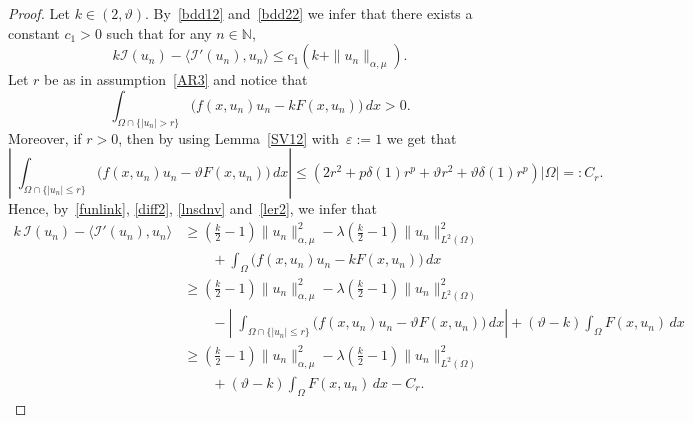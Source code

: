 \documentclass[10pt,a4paper]{amsart}
\def \N {\mathbb{N}}
\renewcommand{\ge}{\geqslant}
\renewcommand{\le}{\leqslant}
\begin{document}
\begin{proof}
Let $k\in (2, \vartheta)$. By~\eqref{bdd12} and~\eqref{bdd22} we infer that there exists a constant $c_1>0$ such that for any $n\in\N$,
\begin{equation}\label{ndkjsc}
k \mathcal I(u_n) -\langle \mathcal I'(u_n), u_n\rangle \le c_1 (k +\|u_n\|_{\alpha, \mu}).
\end{equation}
Let $r$ be as in assumption~\eqref{AR3} and notice that
\begin{equation}\label{lnsdnv}
\int_{\Omega\cap\{|u_n|> r\}} \Big(f(x, u_n) u_n -k F(x, u_n)\Big)\,dx >0.
\end{equation}
Moreover, if $r>0$, then by using Lemma~\ref{SV12} with~$\varepsilon:=1$ we get that
\begin{equation}\label{ler2}
\left|\;\int_{\Omega\cap\{|u_n|\le r\}}  \big(f(x, u_n) u_n -\vartheta F(x, u_n)\big) \,dx\right| \le \left(2r^2 +p\delta(1) r^p + \vartheta r^2 +\vartheta\delta(1) r^p\right)|\Omega|=:C_r.
\end{equation}
Hence, by~\eqref{funlink}, \eqref{diff2},
\eqref{lnsdnv} and~\eqref{ler2}, we infer that
\[
\begin{split}
k\, \mathcal I(u_n) -\langle \mathcal I'(u_n), u_n\rangle &\ge\left(\frac{k}{2}-1\right)\|u_n\|^2_{\alpha, \mu}-\lambda\left(\frac{k}{2}-1\right)\|u_n\|^2_{L^2(\Omega)} \\
&\qquad+\int_\Omega \big(f(x, u_n) u_n -k F(x, u_n)\big) \,dx\\
& \ge\left(\frac{k}{2}-1\right)\|u_n\|^2_{\alpha, \mu}-\lambda\left(\frac{k}{2}-1\right)\|u_n\|^2_{L^2(\Omega)}\\
&\qquad - \left|\;\int_{\Omega\cap\{|u_n|\le r\}}  \Big(f(x, u_n) u_n -\vartheta F(x, u_n)\Big) \,dx\right| +(\vartheta -k)\int_\Omega F(x, u_n) \,dx\\
&\ge\left(\frac{k}{2}-1\right)\|u_n\|^2_{\alpha, \mu}-\lambda\left(\frac{k}{2}-1\right)\|u_n\|^2_{L^2(\Omega)}\\
&\qquad +(\vartheta -k)\int_\Omega F(x, u_n) \,dx- C_r.
\end{split}
\]


\end{proof}
\end{document}
